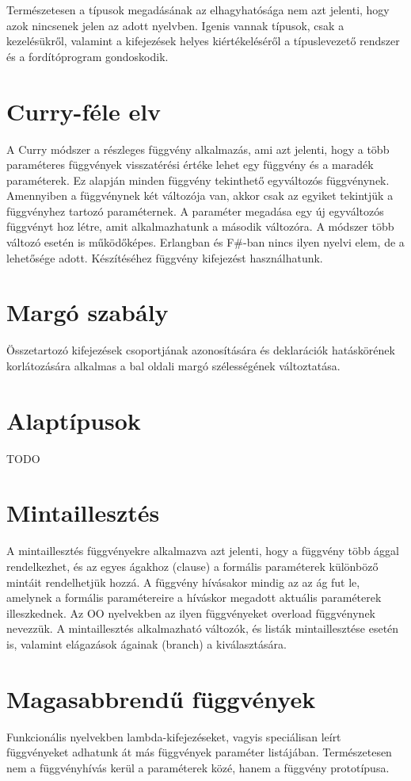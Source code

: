 \documentclass[margin=0px]{article}
\begin{document}
Természetesen a típusok megadásának az elhagyhatósága nem azt jelenti, hogy azok nincsenek jelen az adott nyelvben. Igenis vannak típusok, csak a kezelésükről, valamint a kifejezések helyes kiértékeléséről a típuslevezető rendszer és a fordítóprogram gondoskodik.

\section{Curry-féle elv}
A Curry módszer a részleges függvény alkalmazás, ami azt jelenti, hogy a több paraméteres függvények visszatérési értéke lehet egy függvény és a maradék paraméterek. Ez alapján minden függvény tekinthető egyváltozós függvénynek. Amennyiben a függvénynek két változója van, akkor csak az egyiket tekintjük a függvényhez tartozó paraméternek. A paraméter megadása egy új egyváltozós függvényt hoz létre, amit alkalmazhatunk a második változóra. A módszer több változó esetén is működőképes. Erlangban és F\#-ban nincs ilyen nyelvi elem, de a lehetősége adott. Készítéséhez függvény kifejezést használhatunk.

\section{Margó szabály}
Összetartozó kifejezések csoportjának azonosítására és deklarációk hatáskörének korlátozására alkalmas a bal oldali margó szélességének változtatása.

\section{Alaptípusok}
TODO

\section{Mintaillesztés}
A mintaillesztés függvényekre alkalmazva azt jelenti, hogy a függvény több ággal rendelkezhet, és az egyes ágakhoz (clause) a formális paraméterek különböző mintáit rendelhetjük hozzá. A függvény hívásakor mindig az az ág fut le, amelynek a formális paramétereire a híváskor megadott aktuális paraméterek illeszkednek. Az OO nyelvekben az ilyen függvényeket overload függvénynek nevezzük. A mintaillesztés alkalmazható változók, és listák mintaillesztése esetén is, valamint elágazások ágainak (branch) a kiválasztására.

\section{Magasabbrendű függvények}
Funkcionális nyelvekben lambda-kifejezéseket, vagyis speciálisan leírt függvényeket adhatunk át más függvények paraméter listájában. Természetesen nem a függvényhívás kerül a paraméterek közé, hanem a függvény prototípusa.
\end{document}
